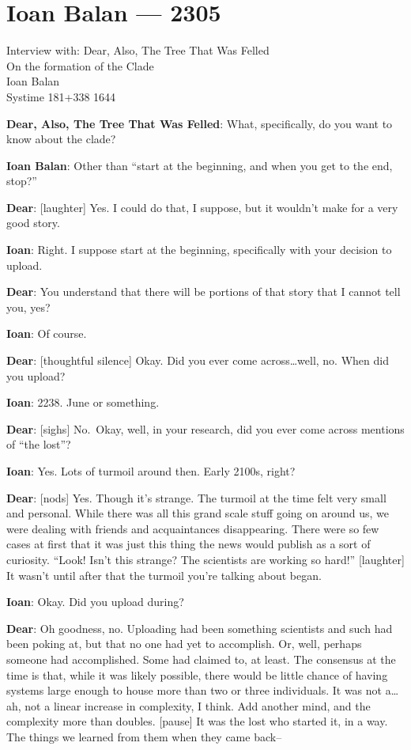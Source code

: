 \hypertarget{ioan-balan-2305}{%
\chapter*{Ioan Balan — 2305}\label{ioan-balan-2305}}

Interview with: Dear, Also, The Tree That Was Felled\\
On the formation of the Clade\\
Ioan Balan\\
Systime 181+338 1644

\textbf{Dear, Also, The Tree That Was Felled}: What, specifically, do you want to know about the clade?

\textbf{Ioan Balan}: Other than ``start at the beginning, and when you get to the end, stop?''

\textbf{Dear}: {[}laughter{]} Yes. I could do that, I suppose, but it wouldn't make for a very good story.

\textbf{Ioan}: Right. I suppose start at the beginning, specifically with your decision to upload.

\textbf{Dear}: You understand that there will be portions of that story that I cannot tell you, yes?

\textbf{Ioan}: Of course.

\textbf{Dear}: {[}thoughtful silence{]} Okay. Did you ever come across\ldots{}well, no. When did you upload?

\textbf{Ioan}: 2238. June or something.

\textbf{Dear}: {[}sighs{]} No.~Okay, well, in your research, did you ever come across mentions of ``the lost''?

\textbf{Ioan}: Yes. Lots of turmoil around then. Early 2100s, right?

\textbf{Dear}: {[}nods{]} Yes. Though it's strange. The turmoil at the time felt very small and personal. While there was all this grand scale stuff going on around us, we were dealing with friends and acquaintances disappearing. There were so few cases at first that it was just this thing the news would publish as a sort of curiosity. ``Look! Isn't this strange? The scientists are working so hard!'' {[}laughter{]} It wasn't until after that the turmoil you're talking about began.

\textbf{Ioan}: Okay. Did you upload during?

\textbf{Dear}: Oh goodness, no. Uploading had been something scientists and such had been poking at, but that no one had yet to accomplish. Or, well, perhaps someone had accomplished. Some had claimed to, at least. The consensus at the time is that, while it was likely possible, there would be little chance of having systems large enough to house more than two or three individuals. It was not a\ldots{}ah, not a linear increase in complexity, I think. Add another mind, and the complexity more than doubles. {[}pause{]} It was the lost who started it, in a way. The things we learned from them when they came back--

